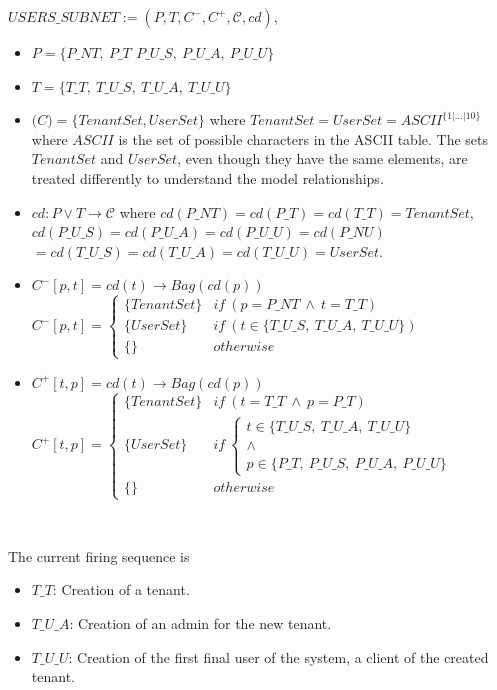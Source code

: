 \documentclass[12pt,english]{article} %
\begin{document}
$USERS\_SUBNET := (P, T, C^-, C^+, \mathcal{C}, cd)$,
\begin{itemize}
    \item $P = \{P\_NT,\ P\_T\,\ P\_U\_S,\ P\_U\_A,\ P\_U\_U\}$
    \item $T = \{T\_T,\ T\_U\_S,\ T\_U\_A,\ T\_U\_U \}$
    \item $\mathcal(C) = \{TenantSet, UserSet\}$ where $TenantSet = UserSet = ASCII^{\{1|...|10\}}$ where $ASCII$ is the set of possible characters in the ASCII table.
    The sets $TenantSet$ and $UserSet$, even though they have the same elements, are treated differently to understand the model relationships.
    \item $cd : P\vee T \rightarrow \mathcal{C}$
    where 
    \newline
    $cd (P\_NT) = cd(P\_T) = cd(T\_T) = TenantSet$,
    \newline
    $cd(P\_U\_S) = cd(P\_U\_A) = cd(P\_U\_U) = cd(P\_NU)$
    \newline
    $= cd(T\_U\_S) = cd(T\_U\_A) = cd(T\_U\_U) = UserSet$.
    \item $C^-[p,t] = cd(t) \rightarrow Bag(cd(p))$ \newline
    $C^-[p,t] = \begin{cases} 
      \{TenantSet\} & if\ (p=P\_NT\ \wedge\ t=T\_T)\\
      \{UserSet\} & if\ (t\in\{T\_U\_S,\ T\_U\_A,\ T\_U\_U\})\\
      \{\}          & otherwise
   \end{cases}$
    \item $C^+[t,p] = cd(t) \rightarrow Bag(cd(p))$\newline
    $C^+[t,p] = \begin{cases} 
    \{TenantSet\} & if\  (t=T\_T\ \wedge\ p=P\_T) \\
    \{UserSet\}   & if\  
    
    \begin{cases} 
        t\in\{T\_U\_S,\ T\_U\_A,\ T\_U\_U\} \\
        \wedge \\
        p\in\{P\_T,\ P\_U\_S,\ P\_U\_A,\ P\_U\_U\}
    \end{cases} \\
    \{\}          & otherwise
   \end{cases}$
\end{itemize}

\

The current firing sequence is 
\begin{itemize}
    \item $T\_T$: Creation of a tenant.
    \item $T\_U\_A$: Creation of an admin for the new tenant.
    \item $T\_U\_U$: Creation of the first final user of the system, a client of the created tenant.
\end{itemize}
\end{document}
